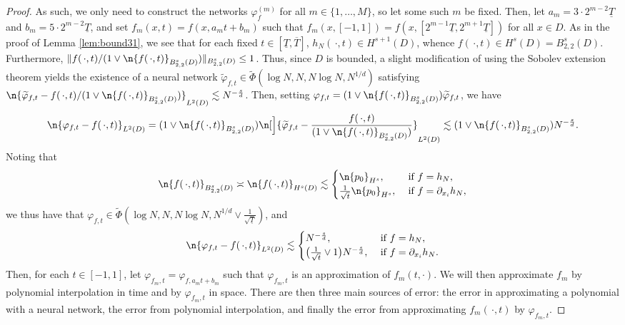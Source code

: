 \documentclass[a4paper, 11pt, headings = small, abstract]{scrartcl}
\begin{document}
\begin{proof}
	As such, we only need to construct the networks $\varphi_{f}^{(m)}$ for all $m\in\{1,\ldots,M\}$, so let some such $m$ be fixed.
	Then, let $a_m=3\cdot2^{m-2}\underline{T}$ and $b_m=5\cdot2^{m-2}\underline{T}$, and set $f_m(x, t)=f(x, a_m t+b_m)$ such that $f_m(x, [-1, 1])=f(x, [2^{m-1}\underline{T}, 2^{m+1}\underline{T}])$ for all $x\in D$.
	As in the proof of Lemma \ref{lem:bound31}, we see that for each fixed $t\in[\underline{T}, \overline{T}]$, $h_N(\,\cdot,t)\in H^{s+1}(D)$, whence $f(\,\cdot,t)\in H^s(D)=B_{2, 2}^s(D)$.
	Furthermore, $\lVert f(\,\cdot,t)/(1\vee\n{f(\,\cdot,t)}_{B_{2, 2}^s(D)})\rVert_{B_{2, 2}^s(D)} \leq 1$.
	Thus, since $D$ is bounded, a slight modification of \cite[Proposition 1]{suzuki19} using the Sobolev extension theorem yields the existence of a neural network $\widetilde{\varphi}_{f, t}\in\widetilde{\Phi}(\log N, N, N\log N, N^{1/d})$ satisfying $\n{\widetilde{\varphi}_{f, t}-f(\,\cdot,t)/(1\vee\n{f(\,\cdot,t)}_{B_{2, 2}^s(D)})}_{L^2(D)}\lesssim N^{-\frac{s}{d}}$.
	Then, setting $\varphi_{f, t}=(1\vee\n{f(\,\cdot,t)}_{B_{2, 2}^s(D)})\widetilde{\varphi}_{f, t}$, we have
	\[
		\n{\varphi_{f, t}-f(\,\cdot,t)}_{L^2(D)}
		=(1\vee\n{f(\,\cdot,t)}_{B_{2, 2}^s(D)})\n[\Big]{\widetilde{\varphi}_{f, t}-\frac{f(\,\cdot,t)}{(1\vee\n{f(\,\cdot,t)}_{B_{2, 2}^s(D)})}}_{L^2(D)}
		\lesssim(1\vee\n{f(\,\cdot,t)}_{B_{2, 2}^s(D)})N^{-\frac{s}{d}}.
	\]
	Noting that
	\[
		\n{f(\,\cdot,t)}_{B_{2, 2}^s(D)}
		\asymp\n{f(\,\cdot,t)}_{H^s(D)}
		\lesssim \begin{cases}
			\n{p_0}_{H^s}, &\text{ if }f=h_N,\\
			\frac{1}{\sqrt{t}}\n{p_0}_{H^s}, &\text{ if }f=\partial_{x_i}h_N,
		\end{cases}
	\]
	we thus have that $\varphi_{f, t}\in\widetilde{\Phi}(\log N, N, N\log N, N^{1/d}\vee\frac{1}{\sqrt{\underline{T}}})$, and
	\[
		\n{\varphi_{f, t}-f(\,\cdot,t)}_{L^2(D)}
		\lesssim \begin{cases}
			N^{-\frac{s}{d}}, &\text{ if }f=h_N,\\
			\big(\frac{1}{\sqrt{t}}\vee1\big)N^{-\frac{s}{d}}, &\text{ if }f=\partial_{x_i}h_N.
		\end{cases}
	\]
	Then, for each $t\in[-1, 1]$, let $\varphi_{f_m, t}=\varphi_{f, a_mt+b_m}$ such that $\varphi_{f_m, t}$ is an approximation of $f_m(t, \cdot)$.
	We will then approximate $f_m$ by polynomial interpolation in time and by $\varphi_{f_m, t}$ in space.
	There are then three main sources of error: the error in approximating a polynomial with a neural network, the error from polynomial interpolation, and finally the error from approximating $f_m(\,\cdot,t)$ by $\varphi_{f_m, t}$.

\end{proof}
\end{document}
